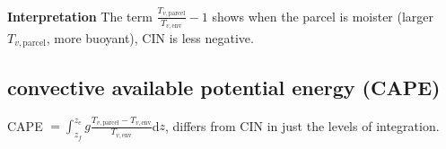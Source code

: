 {\bf Interpretation} The term $\frac{T_{v,\text{parcel}}}{T_{v,\text{env}}} -
1$ shows when the parcel is moister (larger $T_{v,\text{parcel}}$, more buoyant), CIN is less negative.

\subsection{convective available potential energy (CAPE)}
\begin{defn*} 
CAPE $=\int_{z_f}^{z_e} g \frac{T_{v,\text{parcel}} - T_{v,\text{env}}}{T_{v,\text{env}}} $d$z$,
differs from CIN in just the levels of integration.
\end{defn*}


